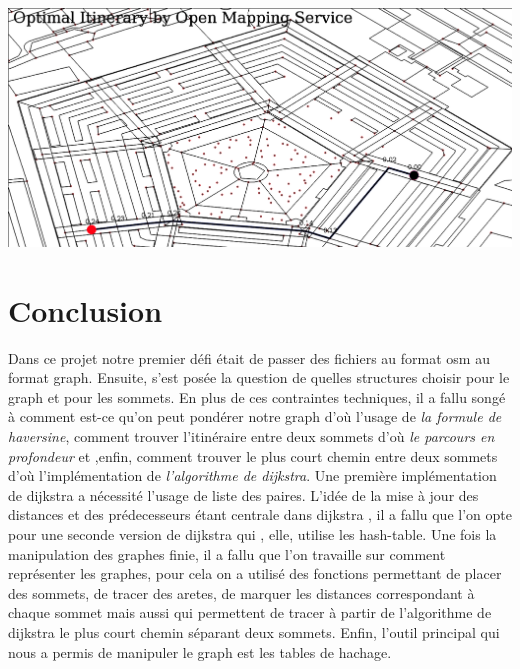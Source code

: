 \documentclass[french]{article}
\begin{document}
\begin{center}
\includegraphics[scale=0.3]{distance1.png}
\end{center}
\newpage
\section{Conclusion}
Dans ce projet notre premier défi était de passer des fichiers au format osm au format graph. Ensuite, s'est posée la question de quelles structures choisir pour le graph et pour les sommets. En plus de ces contraintes techniques, il a fallu songé à comment est-ce qu'on peut pondérer notre graph d'où l'usage de \textit{la formule de haversine}, comment trouver l'itinéraire entre deux sommets d'où \textit{le parcours en profondeur} et ,enfin, comment trouver le plus court chemin entre deux sommets d'où l'implémentation de \textit{l'algorithme de dijkstra}. Une première implémentation de dijkstra a nécessité l'usage de liste des paires. L'idée de la mise à jour des distances et des prédecesseurs étant centrale dans dijkstra , il a fallu que l'on opte pour une seconde version de dijkstra qui , elle, utilise les hash-table. Une fois la manipulation des graphes finie, il a fallu que l'on travaille sur comment représenter les graphes, pour cela on a utilisé des fonctions permettant de placer des sommets, de tracer des aretes, de marquer les distances correspondant à chaque sommet mais aussi qui permettent de tracer à partir de l'algorithme de dijkstra le plus court chemin séparant deux sommets. Enfin, l'outil principal qui nous a permis de manipuler le graph est les tables de hachage. 
 \newpage
\end{document}
